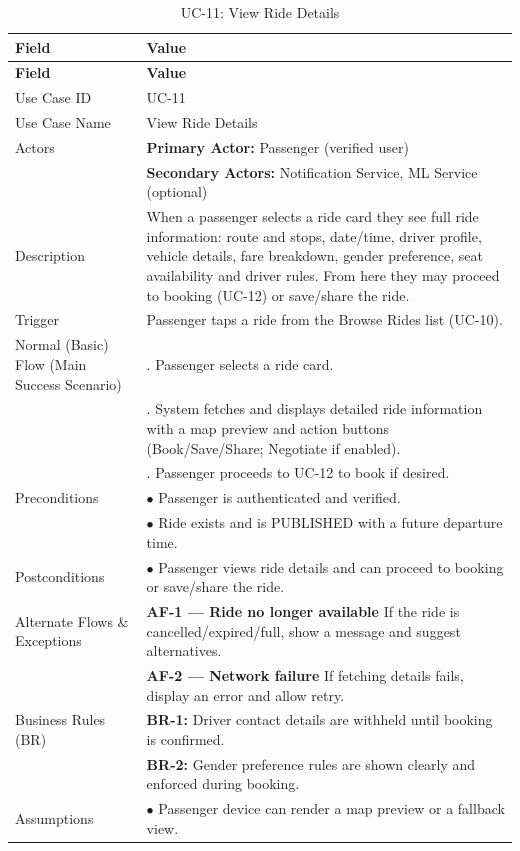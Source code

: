 \begin{longtable}{|>{\raggedright\arraybackslash}p{4cm}|>{\raggedright\arraybackslash}p{11cm}|}
\caption{UC-11: View Ride Details}
\label{tab:uc-11} \\
\hline
\rowcolor{lightgray!30}
\textbf{Field} & \textbf{Value} \\
\hline
\endfirsthead
\hline
\rowcolor{lightgray!30}
\textbf{Field} & \textbf{Value} \\
\hline
\endhead
\hline
\endfoot
\hline
\endlastfoot
Use Case ID & UC-11 \\
\hline
Use Case Name & View Ride Details \\
\hline
Actors & \textbf{Primary Actor:} Passenger (verified user) \\
& \textbf{Secondary Actors:} Notification Service, ML Service (optional) \\
\hline
Description & When a passenger selects a ride card they see full ride information: route and stops, date/time, driver profile, vehicle details, fare breakdown, gender preference, seat availability and driver rules. From here they may proceed to booking (UC-12) or save/share the ride. \\
\hline
Trigger & Passenger taps a ride from the Browse Rides list (UC-10). \\
\hline
Normal (Basic) Flow (Main Success Scenario) & 1. Passenger selects a ride card. \\
& 2. System fetches and displays detailed ride information with a map preview and action buttons (Book/Save/Share; Negotiate if enabled). \\
& 3. Passenger proceeds to UC-12 to book if desired. \\
\hline
Preconditions & $\bullet$ Passenger is authenticated and verified. \\
& $\bullet$ Ride exists and is PUBLISHED with a future departure time. \\
\hline
Postconditions & $\bullet$ Passenger views ride details and can proceed to booking or save/share the ride. \\
\hline
Alternate Flows \& Exceptions & \textbf{AF-1 — Ride no longer available} \newline If the ride is cancelled/expired/full, show a message and suggest alternatives. \\
& \textbf{AF-2 — Network failure} \newline If fetching details fails, display an error and allow retry. \\
\hline
Business Rules (BR) & \textbf{BR-1:} Driver contact details are withheld until booking is confirmed. \\
& \textbf{BR-2:} Gender preference rules are shown clearly and enforced during booking. \\
\hline
Assumptions & $\bullet$ Passenger device can render a map preview or a fallback view. \\
\end{longtable}

